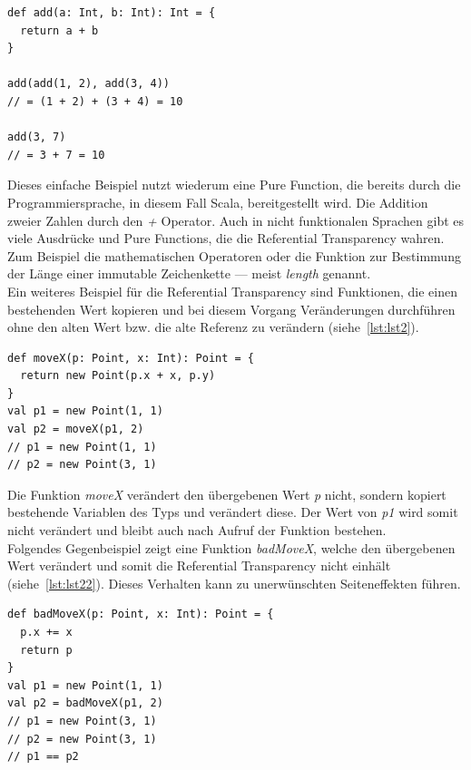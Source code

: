 \begin{lstlisting}[caption={Beispiel für eine Pure Funcition},label={lst:lst1}]
def add(a: Int, b: Int): Int = {
  return a + b
}

add(add(1, 2), add(3, 4))
// = (1 + 2) + (3 + 4) = 10

add(3, 7)
// = 3 + 7 = 10
\end{lstlisting}

Dieses einfache Beispiel nutzt wiederum eine Pure Function, die bereits durch die Programmiersprache, in diesem Fall Scala, bereitgestellt wird. Die Addition zweier Zahlen durch den \textit{+} Operator. Auch in nicht funktionalen Sprachen gibt es viele Ausdrücke und Pure Functions, die die Referential Transparency wahren. Zum Beispiel die mathematischen Operatoren oder die Funktion zur Bestimmung der Länge einer immutable Zeichenkette --- meist \textit{length} genannt.\\

Ein weiteres Beispiel für die Referential Transparency sind Funktionen, die einen bestehenden Wert kopieren und bei diesem Vorgang Veränderungen durchführen ohne den alten Wert bzw. die alte Referenz zu verändern (siehe~\autoref{lst:lst2}).

\begin{lstlisting}[caption={Beispiel einer Funktion mit Referential Transparency.},label={lst:lst2}]
def moveX(p: Point, x: Int): Point = {
  return new Point(p.x + x, p.y)
}
val p1 = new Point(1, 1)
val p2 = moveX(p1, 2)
// p1 = new Point(1, 1)
// p2 = new Point(3, 1)
\end{lstlisting}

Die Funktion \textit{moveX} verändert den übergebenen Wert \textit{p} nicht, sondern kopiert bestehende Variablen des Typs und verändert diese. Der Wert von \textit{p1} wird somit nicht verändert und bleibt auch nach Aufruf der Funktion bestehen.\\
Folgendes Gegenbeispiel zeigt eine Funktion \textit{badMoveX}, welche den übergebenen Wert verändert und somit die Referential Transparency nicht einhält (siehe~\autoref{lst:lst22}). Dieses Verhalten kann zu unerwünschten Seiteneffekten führen.

\begin{lstlisting}[caption={Beispiel einer Funktion ohne Referential Transparency.},label={lst:lst22}]
def badMoveX(p: Point, x: Int): Point = {
  p.x += x
  return p
}
val p1 = new Point(1, 1)
val p2 = badMoveX(p1, 2)
// p1 = new Point(3, 1)
// p2 = new Point(3, 1)
// p1 == p2
\end{lstlisting}

